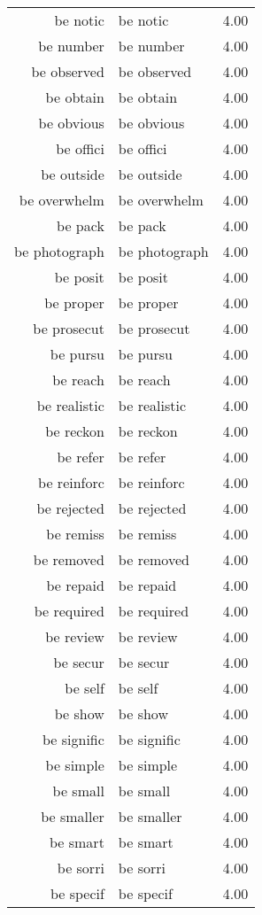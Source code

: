 \begin{table}[ht]
\begin{tabular}{rlr}
  be notic & be notic & 4.00 \\ 
  be number & be number & 4.00 \\ 
  be observed & be observed & 4.00 \\ 
  be obtain & be obtain & 4.00 \\ 
  be obvious & be obvious & 4.00 \\ 
  be offici & be offici & 4.00 \\ 
  be outside & be outside & 4.00 \\ 
  be overwhelm & be overwhelm & 4.00 \\ 
  be pack & be pack & 4.00 \\ 
  be photograph & be photograph & 4.00 \\ 
  be posit & be posit & 4.00 \\ 
  be proper & be proper & 4.00 \\ 
  be prosecut & be prosecut & 4.00 \\ 
  be pursu & be pursu & 4.00 \\ 
  be reach & be reach & 4.00 \\ 
  be realistic & be realistic & 4.00 \\ 
  be reckon & be reckon & 4.00 \\ 
  be refer & be refer & 4.00 \\ 
  be reinforc & be reinforc & 4.00 \\ 
  be rejected & be rejected & 4.00 \\ 
  be remiss & be remiss & 4.00 \\ 
  be removed & be removed & 4.00 \\ 
  be repaid & be repaid & 4.00 \\ 
  be required & be required & 4.00 \\ 
  be review & be review & 4.00 \\ 
  be secur & be secur & 4.00 \\ 
  be self & be self & 4.00 \\ 
  be show & be show & 4.00 \\ 
  be signific & be signific & 4.00 \\ 
  be simple & be simple & 4.00 \\ 
  be small & be small & 4.00 \\ 
  be smaller & be smaller & 4.00 \\ 
  be smart & be smart & 4.00 \\ 
  be sorri & be sorri & 4.00 \\ 
  be specif & be specif & 4.00 \\ 

\end{tabular}
\end{table}
